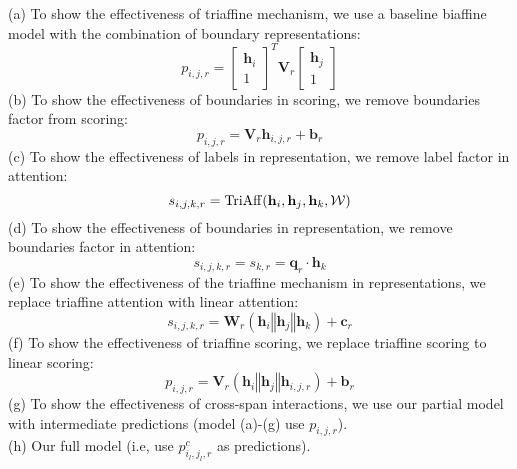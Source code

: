 \documentclass[11pt]{article}
\begin{document}
   \noindent(a) To show the effectiveness of triaffine mechanism, we use
   a baseline biaffine model with the combination of boundary representations:
    \begin{equation}
    p_{i,j,r} = 
    	\left[
    	\begin{aligned}
    	    \mathbf{h}_i \\
    	    1
    	\end{aligned}
    	\right]^T{\mathbf{V}_r}
    	\left[
    	\begin{aligned}
    	    \mathbf{h}_j \\
    	    1
    	\end{aligned}
    	\right]
    \end{equation}
    \noindent(b) To show the effectiveness of boundaries in scoring, we remove boundaries factor from scoring:
    \begin{equation}
        p_{i,j,r} = \mathbf{V}_r\mathbf{h}_{i,j,r} + \mathbf{b}_r
        \label{eq:linear score}
    \end{equation}
    \noindent(c) To show the effectiveness of labels in representation, we remove label factor in attention:
\begin{equation}
        s_{i,j,k,r} = {\rm TriAff}(\mathbf{h}_i, \mathbf{h}_j, \mathbf{h}_k, {\mathcal W})
    \end{equation}
    \noindent(d) To show the effectiveness of boundaries in representation, we remove boundaries factor in attention:
\begin{equation}
        s_{i,j,k,r} = s_{k,r} =  \mathbf{q}_r\cdot\mathbf{h}_k
    \end{equation}
    \noindent(e) To show the effectiveness of the triaffine mechanism in representations, we replace
triaffine attention with linear attention:
\begin{equation}
        s_{i,j,k,r} = \mathbf{W}_r(\mathbf{h}_i \mathbin\Vert \mathbf{h}_j \mathbin\Vert \mathbf{h}_k) + \mathbf{c}_r
    \end{equation}
    \noindent(f) To show the effectiveness of triaffine scoring, we replace
    triaffine scoring to linear scoring:
    \begin{equation}
        p_{i,j,r} = \mathbf{V}_r(
        \mathbf{h}_i \mathbin\Vert \mathbf{h}_j
        \mathbin\Vert
        \mathbf{h}_{i,j,r}) + \mathbf{b}_r
        \label{eq:linear score adv}
    \end{equation}
    \noindent(g) To show the effectiveness of cross-span interactions, we use 
    our partial model with intermediate predictions (model (a)-(g) use $p_{i,j,r}$). \\
    \noindent(h) Our full model (i.e, use $p^c_{i_l,j_l,r}$ as predictions).
    
\end{document}

